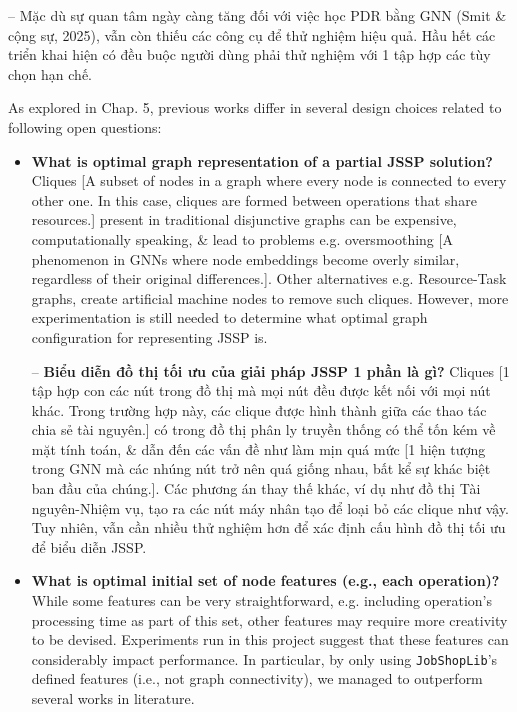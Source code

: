 \documentclass{article}
\begin{document}
\begin{itemize}
\begin{itemize}
        -- Mặc dù sự quan tâm ngày càng tăng đối với việc học PDR bằng GNN (Smit \& cộng sự, 2025), vẫn còn thiếu các công cụ để thử nghiệm hiệu quả. Hầu hết các triển khai hiện có đều buộc người dùng phải thử nghiệm với 1 tập hợp các tùy chọn hạn chế.

        As explored in Chap. 5, previous works differ in several design choices related to following open questions:
        \begin{itemize}
            \item {\bf What is optimal graph representation of a partial JSSP solution?} Cliques [A subset of nodes in a graph where every node is connected to every other one. In this case, cliques are formed between operations that share resources.] present in traditional disjunctive graphs can be expensive, computationally speaking, \& lead to problems e.g. oversmoothing [A phenomenon in GNNs where node embeddings become overly similar, regardless of their original differences.]. Other alternatives e.g. Resource-Task graphs, create artificial machine nodes to remove such cliques. However, more experimentation is still needed to determine what optimal graph configuration for representing JSSP is.

            -- {\bf Biểu diễn đồ thị tối ưu của giải pháp JSSP 1 phần là gì?} Cliques [1 tập hợp con các nút trong đồ thị mà mọi nút đều được kết nối với mọi nút khác. Trong trường hợp này, các clique được hình thành giữa các thao tác chia sẻ tài nguyên.] có trong đồ thị phân ly truyền thống có thể tốn kém về mặt tính toán, \& dẫn đến các vấn đề như làm mịn quá mức [1 hiện tượng trong GNN mà các nhúng nút trở nên quá giống nhau, bất kể sự khác biệt ban đầu của chúng.]. Các phương án thay thế khác, ví dụ như đồ thị Tài nguyên-Nhiệm vụ, tạo ra các nút máy nhân tạo để loại bỏ các clique như vậy. Tuy nhiên, vẫn cần nhiều thử nghiệm hơn để xác định cấu hình đồ thị tối ưu để biểu diễn JSSP.
            \item {\bf What is optimal initial set of node features (e.g., each operation)?} While some features can be very straightforward, e.g. including operation's processing time as part of this set, other features may require more creativity to be devised. Experiments run in this project suggest that these features can considerably impact performance. In particular, by only using {\tt JobShopLib}'s defined features (i.e., not graph connectivity), we managed to outperform several works in literature.


\end{itemize}
\end{itemize}
\end{itemize}
\end{document}
